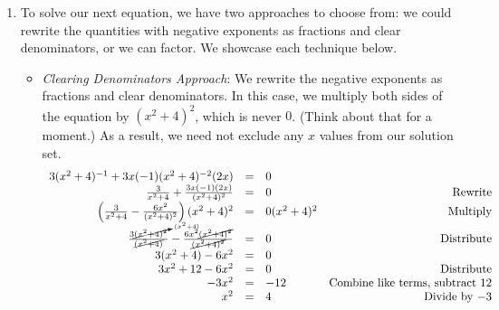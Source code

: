 \documentclass{ximera}
\begin{document}
\begin{example}
\begin{explanation}
\begin{enumerate}
\[\begin{array}{rclr}
(6 + \sqrt{2})w & = & -14 & \text{Factor} \\

w & = & -\frac{14}{6 + \sqrt{2}} & \text{Divide by $6 + \sqrt{2}$} \\ 

\end{array}\] This solution is different than our excluded values, $\frac{1}{\sqrt{2}}$ and $-\frac{5}{2}$, so we keep $w = -\frac{14}{6 + \sqrt{2}}$ as our final answer.  The reader is invited to check this in the original equation.

\item  To solve our next equation, we have two approaches to choose from:  we could rewrite the quantities with negative exponents as fractions and clear denominators, or we can factor.  We showcase each technique below.

\begin{itemize}

\item \textit{Clearing Denominators Approach}:  We rewrite the negative exponents as fractions and clear denominators.  In this case, we multiply both sides of the equation by $(x^2+4)^2$, which is never $0$. (Think about that for a moment.)  As a result, we need not exclude any $x$ values from our solution set.\[ \begin{array}{rclr}

3(x^2+4)^{-1} + 3x(-1)(x^2+4)^{-2}(2x)& = &  0 & \\  

\frac{3}{x^2+4} + \frac{3x(-1)(2x)}{(x^2+4)^2} & = & 0 & \text{Rewrite} \\  
\left(\frac{3}{x^2+4} - \frac{6x^2}{(x^2+4)^2} \right)(x^2+4)^2 & = & 0 (x^2+4)^2 & \text{Multiply} \\ 

\frac{3\cancelto{(x^2+4)}{(x^2 + 4)^2}}{\cancel{(x^2+4)}}  - \frac{6x^2\cancel{(x^2+4)^2}}{\cancel{(x^2+4)^2}} & = & 0 & \text{Distribute} \\  

3(x^2+4) - 6x^2 & = & 0 & \\  

3x^2 + 12 - 6x^2 & = & 0 & \text{Distribute} \\  

-3x^2 & = & -12 & \text{Combine like terms, subtract $12$} \\  

x^2 & = & 4 & \text{Divide by $-3$} \\  


\end{array}\]
\end{itemize}
\end{enumerate}
\end{explanation}
\end{example}
\end{document}
